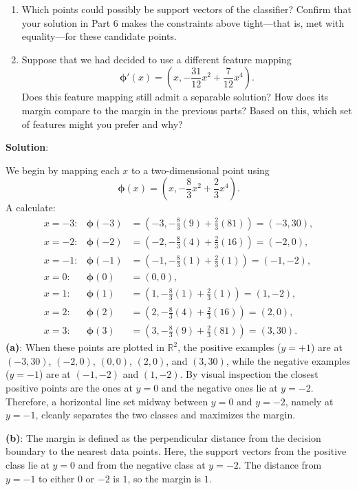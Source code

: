 \documentclass[submit]{../harvardml}
\newenvironment{solution}{
    \vspace{2mm}
    \color{blue}\noindent\textbf{Solution}:
}{}
\begin{document}
\begin{problem}
\begin{enumerate}
    \item Which points could possibly be support vectors of the classifier? Confirm that your solution in Part 6 makes the constraints above tight---that is, met with equality---for these candidate points.

    \item Suppose that we had decided to use a different feature mapping
      \[
         \boldsymbol{\phi}'(x) = \left(x, -\frac{31}{12}x^2 + \frac{7}{12}x^4 \right).
      \]
      Does this feature mapping still admit a separable solution? How does its margin compare to the margin in the previous parts? Based on this, which set of features might you prefer and why?   
  \end{enumerate}
\end{problem}

\begin{solution}
We begin by mapping each $x$ to a two-dimensional point using
\[
\boldsymbol{\phi}(x) = \left(x, -\frac{8}{3}x^2+\frac{2}{3}x^4\right).
\]
A calculate:
\[
\begin{array}{rcl}
x=-3: & \boldsymbol{\phi}(-3) &= (-3, -\tfrac{8}{3}(9) + \tfrac{2}{3}(81)) = (-3, 30),\\[1mm]
x=-2: & \boldsymbol{\phi}(-2) &= (-2, -\tfrac{8}{3}(4) + \tfrac{2}{3}(16)) = (-2, 0),\\[1mm]
x=-1: & \boldsymbol{\phi}(-1) &= (-1, -\tfrac{8}{3}(1) + \tfrac{2}{3}(1)) = (-1, -2),\\[1mm]
x=0:  & \boldsymbol{\phi}(0)  &= (0,0),\\[1mm]
x=1:  & \boldsymbol{\phi}(1)  &= (1, -\tfrac{8}{3}(1) + \tfrac{2}{3}(1)) = (1, -2),\\[1mm]
x=2:  & \boldsymbol{\phi}(2)  &= (2, -\tfrac{8}{3}(4) + \tfrac{2}{3}(16)) = (2, 0),\\[1mm]
x=3:  & \boldsymbol{\phi}(3)  &= (3, -\tfrac{8}{3}(9) + \tfrac{2}{3}(81)) = (3, 30).
\end{array}
\]
\textbf{(a)}: When these points are plotted in $\mathbb{R}^2$, the positive examples ($y=+1$) are at $(-3,30)$, $(-2,0)$, $(0,0)$, $(2,0)$, and $(3,30)$, while the negative examples ($y=-1$) are at $(-1,-2)$ and $(1,-2)$. By visual inspection the closest positive points are the ones at $y=0$ and the negative ones lie at $y=-2$. Therefore, a horizontal line set midway between $y=0$ and $y=-2$, namely at $y=-1$, cleanly separates the two classes and maximizes the margin.

\textbf{(b)}: The margin is defined as the perpendicular distance from the decision boundary to the nearest data points. Here, the support vectors from the positive class lie at $y=0$ and from the negative class at $y=-2$. The distance from $y=-1$ to either $0$ or $-2$ is $1$, so the margin is $1$.


\end{solution}
\end{document}
